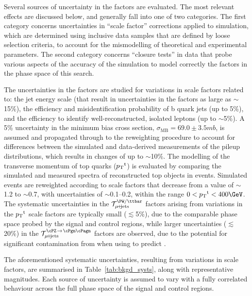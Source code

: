 Several sources of uncertainty in the \tf factors are evaluated.
The most relevant effects are discussed below, and generally fall into
one of two categories. The first category concerns uncertainties in
``scale factor'' corrections applied to simulation, which are
determined using inclusive data samples that are defined by loose
selection criteria, to account for the mismodelling of theoretical and
experimental parameters. The second category concerns ``closure
tests'' in data that probe various aspects of the accuracy of the
simulation to model correctly the \tf factors in the phase space
of this search.

The uncertainties in the \tf factors are studied for variations
in scale factors related to: the jet energy scale (that result in
uncertainties in the \tf factors as large as $\sim$15\%), the
efficiency and misidentification probability of b quark jets (up to
5\%), and the efficiency to identify well-reconstructed, isolated
leptons (up to $\sim$5\%). A 5\% uncertainty in the minimum bias cross
section, $\sigma_\text{MB} = 69.0 \pm 3.5\unit{mb}$, is assumed and
propagated through to the reweighting procedure to account for
differences between the simulated and data-derived measurements of the
pileup distributions, which results in changes of up to
$\sim$10\%. The modelling of the transverse momentum of top quarks
($\Pt^\text{t}$) is evaluated by comparing the simulated and measured
\Pt spectra of reconstructed top objects in \ttbar events. 
Simulated events are reweighted according to scale factors that
decrease from a value of $\sim$1.2 to $\sim$0.7, with uncertainties of
$\sim$0.1--0.2, within the range $0 < \Pt^\text{t} < 400\GeV$. 
The systematic uncertainties in the $\tf^\text{\PW/\ttbar}_{\mj}$
factors arising from variations in the $\Pt^\text{t}$ scale factors
are typically small ($\lesssim$5\%), due to the comparable phase space
probed by the signal and control regions, while larger uncertainties
($\lesssim$20\%) in the $\tf^{\text{\znunu}}_{\mj}$ factors are
observed, due to the potential for significant contamination from
\ttbar when using \wlj to predict \znunuj.

The aforementioned systematic uncertainties, resulting from variations
in scale factors, are summarised in Table~\ref{tab:bkgd_systs}, along
with representative magnitudes.  Each source of uncertainty is assumed
to vary with a fully correlated behaviour across the full phase space
of the signal and control regions.

